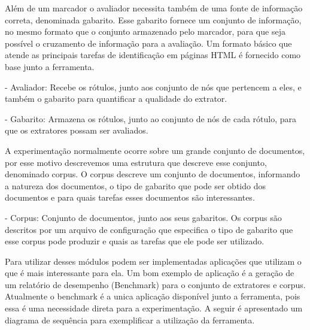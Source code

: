 \documentclass{acm_proc_article-sp}
\numberwithin{equation}{section}
\begin{document}
Além de um marcador o avaliador necessita também de uma fonte de
informação correta, denominada gabarito. Esse gabarito fornece um
conjunto de informação, no mesmo formato que o conjunto armazenado pelo
marcador, para que seja possível o cruzamento de informação para a
avaliação. Um formato básico que atende as principais tarefas de
identificação em páginas HTML é fornecido como base junto a ferramenta.

- Avaliador: Recebe os rótulos, junto aos conjunto de nós que pertencem
a eles, e também o gabarito para quantificar a qualidade do extrator.

- Gabarito: Armazena os rótulos, junto ao conjunto de nós de cada
rótulo, para que os extratores possam ser avaliados.

A experimentação normalmente ocorre sobre um grande conjunto de
documentos, por esse motivo descrevemos uma estrutura que descreve esse
conjunto, denominado corpus. O corpus descreve um conjunto de
documentos, informando a natureza dos documentos, o tipo de gabarito que
pode ser obtido dos documentos e para quais tarefas esses documentos são
interessantes.

- Corpus: Conjunto de documentos, junto aos seus gabaritos. Os corpus
são descritos por um arquivo de configuração que especifica o tipo de
gabarito que esse corpus pode produzir e quais as tarefas que ele pode
ser utilizado.

Para utilizar desses módulos podem ser implementadas aplicações que
utilizam o que é mais interessante para ela. Um bom exemplo de aplicação
é a geração de um relatório de desempenho (Benchmark) para o conjunto de
extratores e corpus. Atualmente o benchmark é a unica aplicação
disponível junto a ferramenta, pois essa é uma necessidade direta para a
experimentação. A seguir é apresentado um diagrama de sequência para
exemplificar a utilização da ferramenta.
\end{document}
